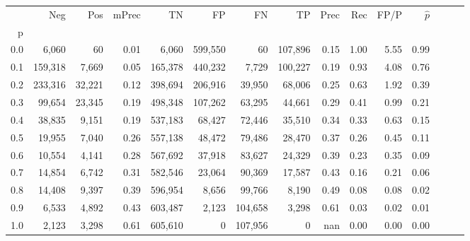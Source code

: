 \begin{tabular}{rrrrrrrrrrrrrrr}
\toprule
{} &      Neg &     Pos & mPrec &       TN &       FP &       FN &       TP &  Prec &   Rec &  FP/P & $\hat{p}$ \\
p   &          &         &       &          &          &          &          &       &       &       &           \\
\midrule
0.0 &    6,060 &      60 &  0.01 &    6,060 &  599,550 &       60 &  107,896 &  0.15 &  1.00 &  5.55 &      0.99 \\
0.1 &  159,318 &   7,669 &  0.05 &  165,378 &  440,232 &    7,729 &  100,227 &  0.19 &  0.93 &  4.08 &      0.76 \\
0.2 &  233,316 &  32,221 &  0.12 &  398,694 &  206,916 &   39,950 &   68,006 &  0.25 &  0.63 &  1.92 &      0.39 \\
0.3 &   99,654 &  23,345 &  0.19 &  498,348 &  107,262 &   63,295 &   44,661 &  0.29 &  0.41 &  0.99 &      0.21 \\
0.4 &   38,835 &   9,151 &  0.19 &  537,183 &   68,427 &   72,446 &   35,510 &  0.34 &  0.33 &  0.63 &      0.15 \\
0.5 &   19,955 &   7,040 &  0.26 &  557,138 &   48,472 &   79,486 &   28,470 &  0.37 &  0.26 &  0.45 &      0.11 \\
0.6 &   10,554 &   4,141 &  0.28 &  567,692 &   37,918 &   83,627 &   24,329 &  0.39 &  0.23 &  0.35 &      0.09 \\
0.7 &   14,854 &   6,742 &  0.31 &  582,546 &   23,064 &   90,369 &   17,587 &  0.43 &  0.16 &  0.21 &      0.06 \\
0.8 &   14,408 &   9,397 &  0.39 &  596,954 &    8,656 &   99,766 &    8,190 &  0.49 &  0.08 &  0.08 &      0.02 \\
0.9 &    6,533 &   4,892 &  0.43 &  603,487 &    2,123 &  104,658 &    3,298 &  0.61 &  0.03 &  0.02 &      0.01 \\
1.0 &    2,123 &   3,298 &  0.61 &  605,610 &        0 &  107,956 &        0 &   nan &  0.00 &  0.00 &      0.00 \\
\bottomrule
\end{tabular}
